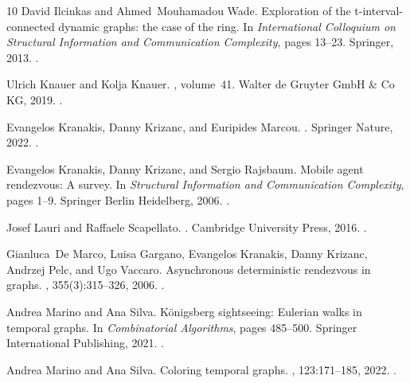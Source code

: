 \documentclass[10pt,a4paper]{article}
\begin{document}
\begin{thebibliography}{10}
David Ilcinkas and Ahmed~Mouhamadou Wade.
\newblock Exploration of the t-interval-connected dynamic graphs: the case of
  the ring.
\newblock In {\em International Colloquium on Structural Information and
  Communication Complexity}, pages 13--23. Springer, 2013.
\newblock \href {https://doi.org/10.1007/978-3-319-03578-9_2}
  {}.

Ulrich Knauer and Kolja Knauer.
,
  volume~41.
\newblock Walter de Gruyter GmbH \& Co KG, 2019.
\newblock \href {https://doi.org/10.1515/9783110617368}
  {}.

Evangelos Kranakis, Danny Krizanc, and Euripides Marcou.
.
\newblock Springer Nature, 2022.
\newblock \href {https://doi.org/10.1007/978-3-031-01999-9}
  {}.

Evangelos Kranakis, Danny Krizanc, and Sergio Rajsbaum.
\newblock Mobile agent rendezvous: A survey.
\newblock In {\em Structural Information and Communication Complexity}, pages
  1--9. Springer Berlin Heidelberg, 2006.
\newblock \href {https://doi.org/10.1007/11780823_1}
  {}.

Josef Lauri and Raffaele Scapellato.
.
\newblock Cambridge University Press, 2016.
\newblock \href {https://doi.org/10.1017/CBO9781316669846}
  {}.

Gianluca~De Marco, Luisa Gargano, Evangelos Kranakis, Danny Krizanc, Andrzej
  Pelc, and Ugo Vaccaro.
\newblock Asynchronous deterministic rendezvous in graphs.
, 355(3):315--326, 2006.
\newblock \href {https://doi.org/10.1016/j.tcs.2005.12.016}
  {}.

Andrea Marino and Ana Silva.
\newblock K{\"o}nigsberg sightseeing: Eulerian walks in temporal graphs.
\newblock In {\em Combinatorial Algorithms}, pages 485--500. Springer
  International Publishing, 2021.
\newblock \href {https://doi.org/10.1007/978-3-030-79987-8_34}
  {}.

Andrea Marino and Ana Silva.
\newblock Coloring temporal graphs.
, 123:171--185, 2022.
\newblock \href {https://doi.org/10.1016/j.jcss.2021.08.004}
  {}.


\end{thebibliography}
\end{document}

